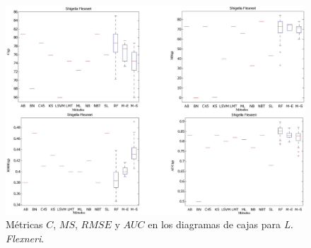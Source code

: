 \begin{landscape}
\begin{figure}[!htb]
\centering
	\includegraphics[keepaspectratio,width=17cm]{figuras/BoxPlot_tanda4.jpg}
	\caption{Métricas $C$, $MS$, $RMSE$ y $AUC$ en los diagramas de cajas para
\textit{L. Flexneri}.}
	\label{fig4aplica}
\end{figure}
\end{landscape}
